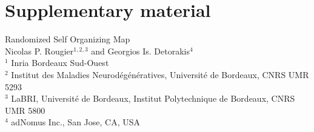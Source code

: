 \section{Supplementary material}

Randomized Self Organizing Map \\ 
Nicolas P. Rougier$^{1,2,3}$ and Georgios Is. Detorakis$^4$ \\
$^1$ Inria Bordeaux Sud-Ouest \\
$^2$ Institut des Maladies Neurodégénératives, Université  de Bordeaux, CNRS UMR 5293 \\
$^3$ LaBRI, Université de Bordeaux, Institut Polytechnique de Bordeaux, CNRS UMR 5800 \\
$^4$ adNomus Inc., San Jose, CA, USA \\
\medskip

\bigskip









